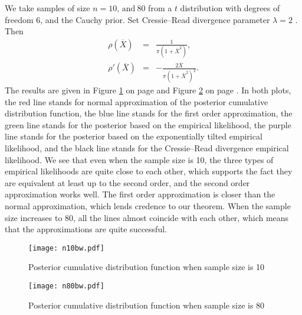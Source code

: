 We take  samples of size $n=10,\mathrm{\, and}\:80$ from a $t$ distribution
with degrees of freedom { $6$}, and the Cauchy prior.
Set Cressie--Read divergence parameter $\lambda=2$ . Then 
\begin{eqnarray*}
\rho\left(\overline{X}\right) & = & \frac{1}{\pi\left(1+\overline{X}^{2}\right)},\\
\rho'\left(\overline{X}\right) & = & -\frac{2\overline{X}}{\pi\left(1+\overline{X}^{2}\right)^{2}}.
\end{eqnarray*}
The results are given in Figure \ref{fig:Posterior-CDF-n10} on page \pageref{fig:Posterior-CDF-n10} and Figure \ref{fig:Posterior-CDF-n80} on page \pageref{fig:Posterior-CDF-n80}.
In both plots, the red line stands for normal approximation of the posterior
cumulative distribution function, the blue line stands for the first
order approximation, the green line stands for the posterior based
on the empirical likelihood, the purple line stands for the posterior
based on the exponentially tilted empirical likelihood, and   the black line
stands for the Cressie--Read divergence empirical likelihood. We 
see that even when the sample size is 10, the three types of empirical
likelihoods are quite close to each other, which supports the fact
they are equivalent  at least up to the second order, and the second order
 approximation works well. The first order approximation is closer
than the normal approximation, which lends credence to our theorem.
When the sample size increases to 80, all the lines almost coincide
with each other, which means that the approximations are quite successful.
\begin{figure}[H]

\begin{center}
\texttt{[image: n10bw.pdf]}\protect\caption{Posterior cumulative distribution function when sample size is 10\label{fig:Posterior-CDF-n10}}
\end{center}

\end{figure}
\begin{figure}[H]

\begin{center}
\texttt{[image: n80bw.pdf]}\protect\caption{Posterior cumulative distribution function when sample size is 80\label{fig:Posterior-CDF-n80}}
\end{center}

\end{figure}
